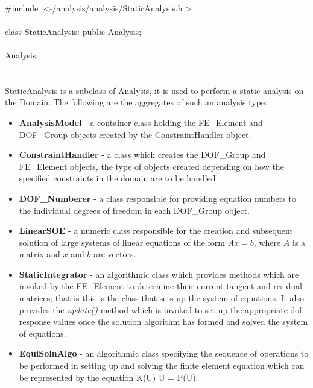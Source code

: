 
   \\
\indent \#include $<\tilde{ }$/analysis/analysis/StaticAnalysis.h$>$  \\

  \\
\indent class StaticAnalysis: public Analysis;  \\

 \\
\indent Analysis \\
\indent{} \\

 \\ 
\indent StaticAnalysis is a subclass of Analysis, it is used to
perform a static analysis on the Domain. The following are the
aggregates of such an analysis type: 
\begin{itemize}
\item {\bf AnalysisModel} - a container class holding the FE\_Element
and DOF\_Group objects created by the ConstraintHandler object. 
\item {\bf ConstraintHandler} - a class which creates the DOF\_Group
and FE\_Element objects, the type of objects created depending on how
the specified constraints in the domain are to be handled. 
\item {\bf DOF\_Numberer} - a class responsible for providing equation
numbers to the individual degrees of freedom in each DOF\_Group object.
\item {\bf LinearSOE} - a numeric class responsible for the creation
and subsequent solution of large systems of linear equations of the
form $Ax = b$, where $A$ is a matrix and $x$ and $b$ are vectors.
\item {\bf StaticIntegrator} - an algorithmic class which provides
methods which are invoked by the FE\_Element to determine their
current tangent and residual matrices; that is this is the class that
sets up the system of equations.  It also provides the {\em
update()} method which is invoked to set up the appropriate dof
response values once the solution algorithm has formed and solved the
system of equations.
\item {\bf EquiSolnAlgo} - an algorithmic class specifying the
sequence of operations to be performed in setting up and solving the
finite element equation which can be represented by the equation K(U)
U = P(U). 
\end{itemize}

